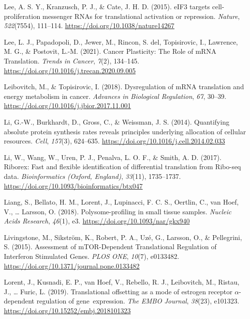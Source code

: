 \documentclass[12pt,openany]{book}
\begin{document}
\hypertarget{ref-Lee2015}{}
Lee, A. S. Y., Kranzusch, P. J., \& Cate, J. H. D. (2015). eIF3 targets
cell-proliferation messenger RNAs for translational activation or
repression. \emph{Nature}, \emph{522}(7554), 111--114.
\url{https://doi.org/10.1038/nature14267}

\hypertarget{ref-Lee2021}{}
Lee, L. J., Papadopoli, D., Jewer, M., Rincon, S. del, Topisirovic, I.,
Lawrence, M. G., \& Postovit, L.-M. (2021). Cancer Plasticity: The Role
of mRNA Translation. \emph{Trends in Cancer}, \emph{7}(2), 134--145.
\url{https://doi.org/10.1016/j.trecan.2020.09.005}

\hypertarget{ref-Leibovitch2018}{}
Leibovitch, M., \& Topisirovic, I. (2018). Dysregulation of mRNA
translation and energy metabolism in cancer. \emph{Advances in
Biological Regulation}, \emph{67}, 30--39.
\url{https://doi.org/10.1016/j.jbior.2017.11.001}

\hypertarget{ref-Li2014}{}
Li, G.-W., Burkhardt, D., Gross, C., \& Weissman, J. S. (2014).
Quantifying absolute protein synthesis rates reveals principles
underlying allocation of cellular resources. \emph{Cell}, \emph{157}(3),
624--635. \url{https://doi.org/10.1016/j.cell.2014.02.033}

\hypertarget{ref-Li2017}{}
Li, W., Wang, W., Uren, P. J., Penalva, L. O. F., \& Smith, A. D.
(2017). Riborex: Fast and flexible identification of differential
translation from Ribo-seq data. \emph{Bioinformatics (Oxford, England)},
\emph{33}(11), 1735--1737.
\url{https://doi.org/10.1093/bioinformatics/btx047}

\hypertarget{ref-Liang2018}{}
Liang, S., Bellato, H. M., Lorent, J., Lupinacci, F. C. S., Oertlin, C.,
van Hoef, V., \ldots{} Larsson, O. (2018). Polysome-profiling in small
tissue samples. \emph{Nucleic Acids Research}, \emph{46}(1), e3.
\url{https://doi.org/10.1093/nar/gkx940}

\hypertarget{ref-Livingstone2015}{}
Livingstone, M., Sikström, K., Robert, P. A., Uzé, G., Larsson, O., \&
Pellegrini, S. (2015). Assessment of mTOR-Dependent Translational
Regulation of Interferon Stimulated Genes. \emph{PLOS ONE},
\emph{10}(7), e0133482.
\url{https://doi.org/10.1371/journal.pone.0133482}

\hypertarget{ref-Lorent2019}{}
Lorent, J., Kusnadi, E. P., van Hoef, V., Rebello, R. J., Leibovitch,
M., Ristau, J., \ldots{} Furic, L. (2019). Translational offsetting as a
mode of estrogen receptor \(\alpha\)-dependent regulation of
gene~expression. \emph{The EMBO Journal}, \emph{38}(23), e101323.
\url{https://doi.org/10.15252/embj.2018101323}
\end{document}
